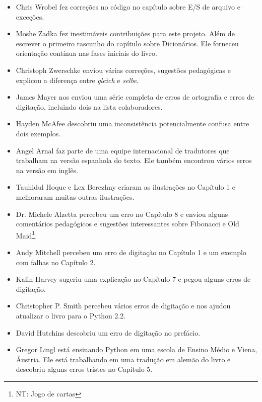\documentclass[10pt]{book}
\begin{document}
\begin {itemize}
\item Chris Wrobel fez correções no código no capítulo sobre
E/S de arquivo e exceções.

\item Moshe Zadka fez inestimáveis contribuições ​​para este projeto.
Além de escrever o primeiro rascunho do capítulo sobre Dicionários. Ele
forneceu orientação contínua nas fases iniciais do livro.

\item Christoph Zwerschke enviou várias correções,
sugestões pedagógicas e explicou a diferença entre {\em gleich}
e {\em selbe}.

\item James Mayer nos enviou uma série completa de erros de ortografia e
erros de digitação, incluindo dois na lista colaboradores.

\item Hayden McAfee descobriu uma inconsistência potencialmente confusa
entre dois exemplos.

\item Angel Arnal faz parte de uma equipe internacional de tradutores
que trabalham na versão espanhola do texto. Ele também encontrou vários
erros na versão em inglês.

\item Tauhidul Hoque e Lex Berezhny criaram as ilustrações
no Capítulo 1 e melhoraram muitas outras ilustrações.

\item Dr. Michele Alzetta percebeu um erro no Capítulo 8 e enviou
alguns comentários pedagógicos e sugestões interessantes sobre Fibonacci
e Old Maid\footnote{NT: Jogo de cartas}.

\item Andy Mitchell percebeu um erro de digitação no Capítulo 1 e um exemplo com falhas
no Capítulo 2.

\item Kalin Harvey sugeriu uma explicação no Capítulo 7 e
pegou alguns erros de digitação.

\item Christopher P. Smith percebeu vários erros de digitação e nos ajudou
atualizar o livro para o Python 2.2.

\item David Hutchins descobriu um erro de digitação no prefácio.

\item Gregor Lingl está ensinando Python em uma escola de Ensino Médio e
Viena, Áustria. Ele está trabalhando em uma tradução em alemão do livro
e descobriu alguns erros tristes no Capítulo 5.


\end{itemize}
\end{document}
